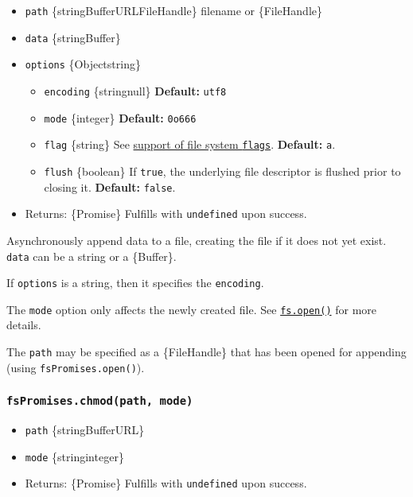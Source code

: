 \begin{itemize}
\tightlist
\item
  \texttt{path} \{string\textbar Buffer\textbar URL\textbar FileHandle\}
  filename or \{FileHandle\}
\item
  \texttt{data} \{string\textbar Buffer\}
\item
  \texttt{options} \{Object\textbar string\}

  \begin{itemize}
  \tightlist
  \item
    \texttt{encoding} \{string\textbar null\} \textbf{Default:}
    \texttt{\textquotesingle{}utf8\textquotesingle{}}
  \item
    \texttt{mode} \{integer\} \textbf{Default:} \texttt{0o666}
  \item
    \texttt{flag} \{string\} See \hyperref[file-system-flags]{support of
    file system \texttt{flags}}. \textbf{Default:}
    \texttt{\textquotesingle{}a\textquotesingle{}}.
  \item
    \texttt{flush} \{boolean\} If \texttt{true}, the underlying file
    descriptor is flushed prior to closing it. \textbf{Default:}
    \texttt{false}.
  \end{itemize}
\item
  Returns: \{Promise\} Fulfills with \texttt{undefined} upon success.
\end{itemize}

Asynchronously append data to a file, creating the file if it does not
yet exist. \texttt{data} can be a string or a \{Buffer\}.

If \texttt{options} is a string, then it specifies the
\texttt{encoding}.

The \texttt{mode} option only affects the newly created file. See
\hyperref[fsopenpath-flags-mode-callback]{\texttt{fs.open()}} for more
details.

The \texttt{path} may be specified as a \{FileHandle\} that has been
opened for appending (using \texttt{fsPromises.open()}).

\subsubsection{\texorpdfstring{\texttt{fsPromises.chmod(path,\ mode)}}{fsPromises.chmod(path, mode)}}\label{fspromises.chmodpath-mode}

\begin{itemize}
\tightlist
\item
  \texttt{path} \{string\textbar Buffer\textbar URL\}
\item
  \texttt{mode} \{string\textbar integer\}
\item
  Returns: \{Promise\} Fulfills with \texttt{undefined} upon success.
\end{itemize}

